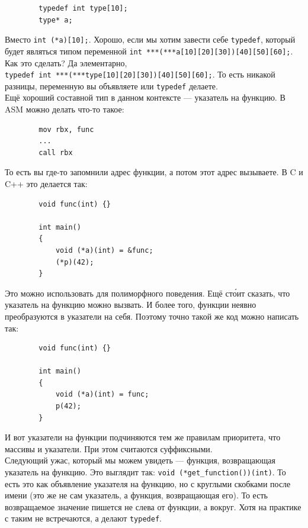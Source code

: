 \documentclass{article}
\begin{document}
    \begin{verbatim}
        typedef int type[10];
        type* a;
    \end{verbatim}
    Вместо \texttt{int (*a)[10];}. Хорошо, если мы хотим завести себе \texttt{typedef}, который будет являться типом переменной \texttt{int ***(***a[10][20][30])[40][50][60];}. Как это сделать? Да элементарно,\\
    \texttt{typedef int ***(***type[10][20][30])[40][50][60];}. То есть никакой разницы, переменную вы объявляете или \texttt{typedef} делаете.\\
    Ещё хороший составной тип в данном контексте --- указатель на функцию. В ASM можно делать что-то такое:
    \begin{verbatim}
        mov rbx, func
        ...
        call rbx
    \end{verbatim}
    То есть вы где-то запомнили адрес функции, а потом этот адрес вызываете. В C и C++ это делается так:
    \begin{verbatim}
        void func(int) {}
        
        int main()
        {
            void (*a)(int) = &func;
            (*p)(42);
        }
    \end{verbatim}
    Это можно использовать для полиморфного поведения. Ещё ст\'{о}ит сказать, что указатель на функцию можно вызвать. И более того, функции неявно преобразуются в указатели на себя. Поэтому точно такой же код можно написать так:
    \begin{verbatim}
        void func(int) {}
        
        int main()
        {
            void (*a)(int) = func;
            p(42);
        }
    \end{verbatim}
    И вот указатели на функции подчиняются тем же правилам приоритета, что массивы и указатели. При этом считаются суффиксными.\\
    Следующий ужас, который мы можем увидеть --- функция, возвращающая указатель на функцию. Это выглядит так: \texttt{void (*get_function())(int)}. То есть это как объявление указателя на функцию, но с круглыми скобками после имени (это же не сам указатель, а функция, возвращающая его). То есть возвращаемое значение пишется не слева от функции, а вокруг. Хотя на практике с таким не встречаются, а делают \texttt{typedef}.
\end{document}

